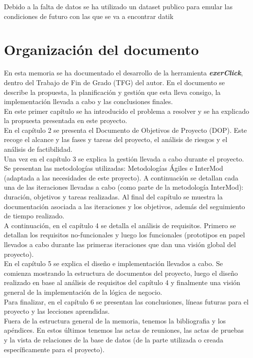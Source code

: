 Debido a la falta de datos se ha utilizado un dataset publico para emular las condiciones de futuro con las que se va a encontrar datik

\section{Organización del documento}

En esta memoria se ha documentado  el desarrollo de la herramienta \textbf{\textit{exerClick}}, dentro del Trabajo de Fin de Grado (TFG) del autor. En el documento se describe la propuesta, la planificación y gestión que esta lleva consigo, la implementación llevada a cabo y las conclusiones finales.\\

En este primer capítulo se ha introducido el problema a resolver y se ha explicado la propuesta presentada en este proyecto.\\

En el capítulo 2 se presenta el Documento de Objetivos de Proyecto (DOP). Este recoge el alcance y las fases y tareas del proyecto, el análisis de riesgos y el análisis de factibilidad.\\

Una vez en el capítulo 3 se explica la gestión llevada a cabo durante el proyecto. Se presentan las metodologías utilizadas: Metodologías Ágiles e InterMod (adaptada a las necesidades de este proyecto). A continuación se detallan cada una de las iteraciones llevadas a cabo (como parte de la metodología InterMod): duración, objetivos y tareas realizadas. Al final del capítulo se muestra la documentación asociada a las iteraciones y los objetivos, además del seguimiento de tiempo realizado.\\

A continuación, en el capítulo 4 se detalla el análisis de requisitos. Primero se detallan los requisitos no-funcionales y luego los funcionales (prototipos en papel llevados a cabo durante las primeras iteraciones que dan una visión global del proyecto).\\

En el capítulo 5 se explica el diseño e implementación llevados a cabo. Se comienza mostrando la estructura de documentos del proyecto, luego el diseño realizado en base al análisis de requisitos del capítulo 4 y finalmente una visión general de la implementación de la lógica de negocio.\\

Para finalizar, en el capítulo 6 se presentan las conclusiones, líneas futuras para el proyecto y las lecciones aprendidas.\\

Fuera de la estructura general de la memoria, tenemos la bibliografia y los apéndices. En estos últimos tenemos las actas de reuniones, las actas de pruebas y la vista de relaciones de la base de datos (de la parte utilizada o creada específicamente para el proyecto).\\